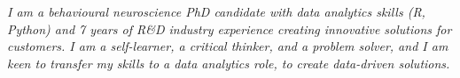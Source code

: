 
\textit{I am a behavioural neuroscience PhD candidate with data analytics skills (R, Python) and 7 years of R\&D industry experience creating innovative solutions for customers.
I am a self-learner, a critical thinker, and a problem solver, and I am keen to transfer my skills to a data analytics role, to create data-driven solutions.
}
